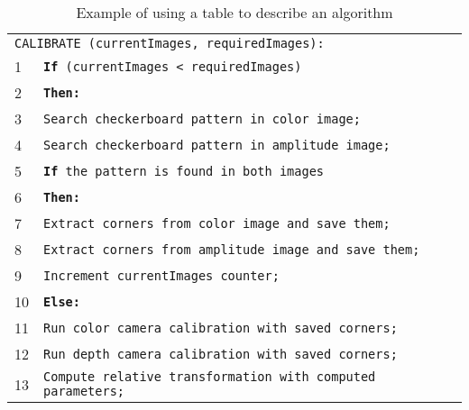 \begin{table}[ht]
\caption{Example of using a table to describe an algorithm}
\begin{center}
\begin{tabular}{ l l }
\hline
\multicolumn{2}{l}{\texttt{CALIBRATE (currentImages, requiredImages):}} \\
1 & \texttt{{\bf If} (currentImages < requiredImages)} \\
2 & \hspace{0.6cm} \texttt{\bf Then:} \\
3 & \hspace{1.2cm} \texttt{Search checkerboard pattern in color image;} \\
4 & \hspace{1.2cm} \texttt{Search checkerboard pattern in amplitude image;} \\
5 & \hspace{1.2cm} \texttt{{\bf If} the pattern is found in both images} \\
6 & \hspace{1.8cm} \texttt{\bf Then:} \\
7 & \hspace{2.4cm} \texttt{Extract corners from color image and save them;} \\
8 & \hspace{2.4cm} \texttt{Extract corners from amplitude image and save them;} \\
9 & \hspace{2.4cm} \texttt{Increment currentImages counter;} \\
10 & \hspace{0.6cm} \texttt{\bf Else:} \\
11 & \hspace{1.2cm} \texttt{Run color camera calibration with saved corners;} \\
12 & \hspace{1.2cm} \texttt{Run depth camera calibration with saved corners;} \\
13 & \hspace{1.2cm} \texttt{Compute relative transformation with computed parameters;} \\
\hline
\end{tabular}
\end{center}
\label{algorithm}
\end{table}